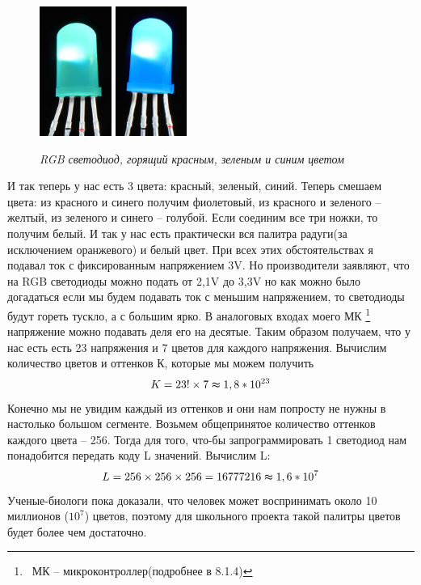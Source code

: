 \documentclass[a4paper, 12pt]{article}
\begin{document}
\begin{figure}[ht]
  \includegraphics[height=160px]{img/Светодиод зеленый.jpg}
  \includegraphics[height=160px]{img/Светодиод синий.jpg}
  \caption{\textit{RGB светодиод, горящий красным, зеленым и синим цветом}}
\end{figure}

И так теперь у нас есть 3 цвета: красный, зеленый, синий.
Теперь смешаем цвета: из красного и синего получим фиолетовый,
из красного и зеленого -- желтый, из зеленого и синего -- голубой.
Если соединим все три ножки, то получим белый.
И так у нас есть практически вся палитра радуги(за исключением оранжевого)
и белый цвет. При всех этих обстоятельствах я подавал ток с фиксированным напряжением
3V. Но производители заявляют, что на RGB светодиоды можно подать от 2,1V до 3,3V но
как можно было догадаться если мы будем подавать ток с меньшим напряжением, то светодиоды
будут гореть тускло, а с большим ярко. В аналоговых входах моего МК
\footnote{\ МК -- микроконтроллер(подробнее в 8.1.4)}
напряжение можно подавать деля его на десятые. Таким образом получаем, что у
нас есть есть 23 напряжения и 7 цветов для каждого напряжения. Вычислим
количество цветов и оттенков К, которые мы можем получить $$K=23!\times
  7\thickapprox 1,8*10^{23}$$ Конечно мы не увидим каждый из оттенков и они нам
попросту не нужны в настолько большом сегменте. Возьмем общепринятое количество
оттенков каждого цвета -- 256. Тогда для того, что-бы запрограммировать 1
светодиод нам понадобится передать коду L значений. Вычислим L: $$L=256\times
  256\times 256= 16777216 \thickapprox 1,6*10^7$$ Ученые-биологи пока доказали,
что человек может воспринимать около 10 миллионов ($10^7$) цветов, поэтому для
школьного проекта такой палитры цветов будет более чем достаточно.
\end{document}
